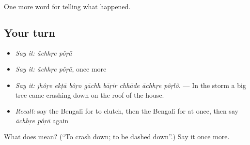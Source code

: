 \begin{grammarlens}[title={What you've built}]
One more word for telling what happened.
\end{grammarlens}

\subsection*{Your turn}
\begin{itemize}
\raggedright
  \item \emph{Say it:} \emph{āchhṛe pôṛā}
  \item \emph{Say it:} \emph{āchhṛe pôṛā}, once more
  \item \emph{Say it:} \emph{jhôṛe ekṭā bôṛo gāchh bāṛir chhāde āchhṛe pôṛlô.} — In the storm a big tree came crashing down on the roof of the house.
  \item \emph{Recall:} say the Bengali for to clutch, then the Bengali for at once, then say \emph{āchhṛe pôṛā} again
\end{itemize}

\begin{tcolorbox}[breakable,colback=teal!4,colframe=teal!35!black,title={Before you move on}]
What does   mean? (\textquotedblleft{}To crash down; to be dashed down\textquotedblright{}.) Say it once more.
\end{tcolorbox}
